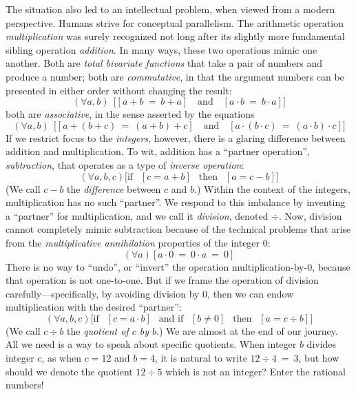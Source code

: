 The situation also led to an intellectual problem, when viewed from a
modern perspective.  Humans strive for conceptual parallelism.  The
arithmetic operation {\it multiplication} was surely recognized not
long after its slightly more fundamental sibling operation {\it
  addition}.  In many ways, these two operations mimic one another.
Both are {\em total bivariate functions} that take a pair of numbers
and produce a number; both are {\em commutative}, in that the argument
numbers can be presented in either order without changing the result:
\[ (\forall a,b) \ \ \big[ [a+b \ = \ b+a]
 \ \ \ \mbox{ and } \ \ \
[a \cdot b \ = \ b \cdot a] \big]
\]
both are {\em associative}, in the sense asserted by the equations
\[
(\forall a,b) \ \ \big[ [a+(b+c) \ = \ (a+b)+c]
 \ \ \ \mbox{ and } \ \ \ 
[a \cdot (b \cdot c) \ = \ (a \cdot b) \cdot c] \big]
\]
If we restrict focus to the {\em integers}, however, there is a
glaring difference between addition and multiplication.  To wit,
addition has a ``partner operation'', {\it subtraction}, that operates
as a type of {\it inverse operation}:
\[ (\forall a, b, c) \big[ \mbox{if } \ \ [c = a + b] \ \ \mbox{ then }
  \ \ [a = c-b] \big]
\]
(We call $c-b$ the {\em difference} between $c$ and $b$.)  Within the
context of the integers, multiplication has no such ``partner''.  We
respond to this imbalance by inventing a ``partner'' for
multiplication, and we call it {\it division}, denoted $\div$.  Now,
division cannot completely mimic subtraction because of the technical
problems that arise from the {\em multiplicative annihilation}
\index{$0$: the multiplicative annihilator} properties of the integer
$0$:
\[ (\forall a) \left[ a \cdot 0 \ = \ 0 \cdot a \ = \ 0 \right] \] 
There is no way to ``undo'', or ``invert'' the operation
multiplication-by-$0$, because that operation is not one-to-one.  But
if we frame the operation of division carefully---specifically, by
avoiding division by $0$, then we can endow multiplication with the
desired ``partner'':
\[ (\forall a, b, c) \big[ \mbox{if } \ \ [c = a \cdot b] \ \
\mbox{ and if } \ \ [b \neq 0] \ \
 \mbox{ then }
  \ \ [a = c \div b] \big]
\]
(We call $c \div b$ the {\em quotient of $c$ by $b$}.)
 We are almost at the end of our journey.  All we need
is a way to speak about specific quotients.  When integer $b$ divides
integer $c$, as when $c = 12$ and $b = 4$, it is natural to write $12
\div 4 \ = \ 3$, but how should we denote the quotient $12 \div 5$
which is not an integer?  Enter the rational numbers!


